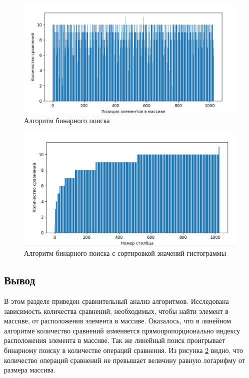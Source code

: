 \documentclass{article}
\begin{document}
\begin{figure}[h]
	\centering
	\includegraphics[scale=0.9]{tools/Screenshot_2.png}
	\caption{Алгоритм бинарного поиска}
	\label{grph:BP}
\end{figure}

\begin{figure}[h]
	\centering
	\includegraphics[scale=0.9]{tools/Screenshot_3.png}
	\caption{Алгоритм бинарного поиска с сортировкой значений гистограммы}
	\label{grph:BP_sort}
\end{figure}

\clearpage\subsection{Вывод}
В этом разделе приведен сравнительный анализ алгоритмов. Исследована зависимость количества сравнений, необходимых, 
чтобы найти элемент в массиве, от расположения элемента в массиве. Оказалось, что в линейном алгоритме количество
сравнений изменяется прямопропорционально индексу расположения элемента в массиве. Так же линейный поиск
проигрывает бинарному поиску в количестве операций сравнения. Из рисунка \ref{grph:BP_sort} видно, что количество
операций сравнений не превышает величину равную логарифму от размера массива.
\end{document}
